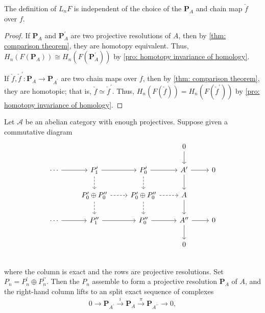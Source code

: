 \documentclass[12pt, oneside]{book}
\begin{document}
\begin{lemma}
    The definition of $L_n F$ is independent of the choice of the $\mathbf{P}_A$ and chain map $\check{f}$ over $f$.
    \begin{proof}
        If $\mathbf{P}_A$ and $\mathbf{P}_A^{\prime}$ are two projective resolutions of $A$, then by \cref{thm: comparison theorem}, they are homotopy equivalent.
        Thus, $H_n\left(F\left(\mathbf{P}_A\right)\right) \cong H_n\left(F\left(\mathbf{P}_A^{\prime}\right)\right)$ by \cref{pro: homotopy invariance of homology}.

        \smallskip

        If $\check{f}, \check{f}^{\prime}: \mathbf{P}_A \rightarrow \mathbf{P}_{A^{\prime}}$ are two chain maps over $f$, then by \cref{thm: comparison theorem}, they are homotopic; that is, $\check{f} \simeq \check{f}^{\prime}$.
        Thus, $H_n(F(\check{f}))=H_n\left(F\left(\check{f}^{\prime}\right)\right)$ by \cref{pro: homotopy invariance of homology}.
    \end{proof}
\end{lemma}




\begin{lemma}
    \label{lem: horseshoe lemma}
    Let $\mathcal{A}$ be an abelian category with enough projectives.
    Suppose given a commutative diagram
    \begin{equation*}
        \begin{tikzcd}
            &&& 0 \arrow[d,""] &\\
            \cdots\arrow[r,""]&P_1^\prime\arrow[r,""] \arrow[d,dashed,""]&P_0^\prime \arrow[d,dashed,""]\arrow[r,""] &A^\prime \arrow[r,""]\arrow[d,""]&0\\
            &P_0^\prime \oplus P_0^{\prime\prime} \arrow[r,dashed,""] \arrow[d,dashed,""]&P_0^\prime \oplus P_0^{\prime\prime}\arrow[d,dashed,""] \arrow[r,dashed,""]& A \arrow[d,""]&\\
            \cdots\arrow[r,""]&P_1^{\prime\prime}\arrow[r,""]&P_0^{\prime\prime}\arrow[r,""]&A^{\prime\prime}\arrow[r,""]\arrow[d,""]&0\\
            &&&0&\\
        \end{tikzcd}
    \end{equation*}
    where the column is exact and the rows are projective resolutions. Set $P_n= P_n^{\prime} \oplus P_n^{\prime \prime}$. Then the $P_n$ assemble to form a projective resolution $\mathbf{P}_A$ of $A$, and the right-hand column lifts to an split exact sequence of complexes
    \begin{equation*}
        0 \rightarrow \mathbf{P}_{A^{\prime}} \xrightarrow{i} \mathbf{P}_A \xrightarrow{\pi} \mathbf{P}_{A^{\prime \prime}} \rightarrow 0,
    \end{equation*}
\end{lemma}
\end{document}
